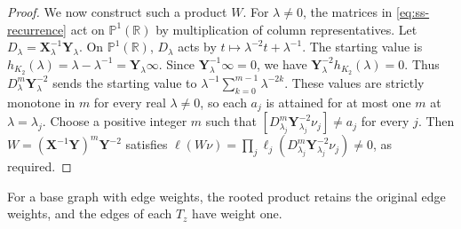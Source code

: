 \documentclass[11pt,a4paper]{article}
\theoremstyle{plain}
\theoremstyle{definition}
\newcommand{\R}{\mathbb{R}}
\begin{document}
\begin{proof}
We now construct such a product $W$.
For $\lambda\ne0$, the matrices in \cref{eq:ss-recurrence} act on
$\mathbb P^1(\R)$ by multiplication of column representatives.
Let $D_\lambda=\mathbf{X}_\lambda^{-1}\mathbf{Y}_\lambda$.
On $\mathbb P^1(\R)$, $D_\lambda$ acts by
$t\mapsto\lambda^{-2}t+\lambda^{-1}$.
The starting value is $h_{K_2}(\lambda)=\lambda-\lambda^{-1}=\mathbf{Y}_\lambda\infty$.
Since $\mathbf{Y}_\lambda^{-1}\infty=0$, we have
$\mathbf{Y}_\lambda^{-2}h_{K_2}(\lambda)=0$.
Thus $D_\lambda^m\mathbf{Y}_\lambda^{-2}$ sends the starting value to
$\lambda^{-1}\sum_{k=0}^{m-1}\lambda^{-2k}$.
These values are strictly monotone in $m$ for every real $\lambda\ne0$,
so each $a_j$ is attained for at most one $m$ at $\lambda=\lambda_j$.
Choose a positive integer $m$ such that
$[D_{\lambda_j}^m\mathbf{Y}_{\lambda_j}^{-2}\nu_j]\ne a_j$ for every $j$.
Then $W=(\mathbf{X}^{-1}\mathbf{Y})^m\mathbf{Y}^{-2}$ satisfies
$\ell(W\nu)=\prod_j\ell_j(D_{\lambda_j}^m\mathbf{Y}_{\lambda_j}^{-2}\nu_j)\ne0$,
as required.
\end{proof}

For a base graph with edge weights, the rooted product retains the
original edge weights, and the edges of each $T_z$ have weight one.
\end{document}
